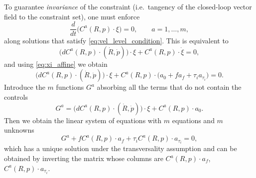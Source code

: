 \documentclass[letterpaper, 10 pt, conference]{ieeeconf}
\begin{document}
To guarantee \emph{invariance} of the constraint (i.e.\ tangency of the closed-loop vector field to the constraint set),
one must enforce
\begin{equation}\label{eq:inv_requirement}
\frac{d}{dt}\Big(C^{a}(R,p) \cdot \xi\Big)=0,\qquad a=1,\dots,m,
\end{equation}
along solutions that satisfy \eqref{eq:vel_level_condition}. This is equivalent to
\begin{equation}
\Big(dC^{a}(R,p) \cdot (\dot{R}, \dot{p})\Big) \cdot \xi + C^{a}(R,p) \cdot \dot{\xi}=0,
\end{equation}
and using \eqref{eq:xi_affine} we obtain
\begin{equation*}
\Big(dC^{a}(R,p) \cdot (\dot{R}, \dot{p})\Big) \cdot \xi + C^{a}(R,p) \cdot \Big( a_{0} + f a_{f} + \tau_{i} a_{\tau_{i}}\Big)=0.
\end{equation*}
Introduce the $m$ functions $G^{a}$ absorbing all the terms that do not contain the controls
$$G^{a} = \Big(dC^{a}(R,p) \cdot (\dot{R}, \dot{p})\Big) \cdot \xi + C^{a}(R,p) \cdot a_{0}.$$
Then we obtain the linear system of equations with $m$ equations and $m$ unknowns
$$G^{a} +  f C^{a}(R,p)\cdot a_{f} + \tau_{i} C^{a}(R,p)\cdot a_{\tau_{i}}=0,$$
which has a unique solution under the transversality assumption and can be obtained by inverting the matrix whose columns are $C^{a}(R,p)\cdot a_{f}$, $C^{a}(R,p)\cdot a_{\tau_{i}}$.

%


\end{document}
